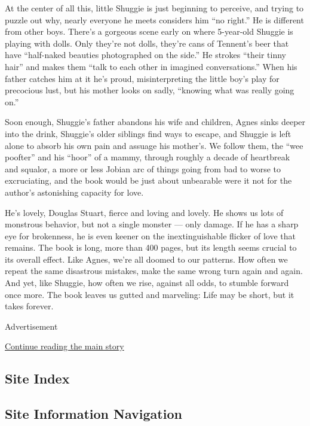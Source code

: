At the center of all this, little Shuggie is just beginning to perceive,
and trying to puzzle out why, nearly everyone he meets considers him
``no right.'' He is different from other boys. There's a gorgeous scene
early on where 5-year-old Shuggie is playing with dolls. Only they're
not dolls, they're cans of Tennent's beer that have ``half-naked
beauties photographed on the side.'' He strokes ``their tinny hair'' and
makes them ``talk to each other in imagined conversations.'' When his
father catches him at it he's proud, misinterpreting the little boy's
play for precocious lust, but his mother looks on sadly, ``knowing what
was really going on.''

Soon enough, Shuggie's father abandons his wife and children, Agnes
sinks deeper into the drink, Shuggie's older siblings find ways to
escape, and Shuggie is left alone to absorb his own pain and assuage his
mother's. We follow them, the ``wee poofter'' and his ``hoor'' of a
mammy, through roughly a decade of heartbreak and squalor, a more or
less Jobian arc of things going from bad to worse to excruciating, and
the book would be just about unbearable were it not for the author's
astonishing capacity for love.

He's lovely, Douglas Stuart, fierce and loving and lovely. He shows us
lots of monstrous behavior, but not a single monster --- only damage. If
he has a sharp eye for brokenness, he is even keener on the
inextinguishable flicker of love that remains. The book is long, more
than 400 pages, but its length seems crucial to its overall effect. Like
Agnes, we're all doomed to our patterns. How often we repeat the same
disastrous mistakes, make the same wrong turn again and again. And yet,
like Shuggie, how often we rise, against all odds, to stumble forward
once more. The book leaves us gutted and marveling: Life may be short,
but it takes forever.

Advertisement

\protect\hyperlink{after-bottom}{Continue reading the main story}

\hypertarget{site-index}{%
\subsection{Site Index}\label{site-index}}

\hypertarget{site-information-navigation}{%
\subsection{Site Information
Navigation}\label{site-information-navigation}}

